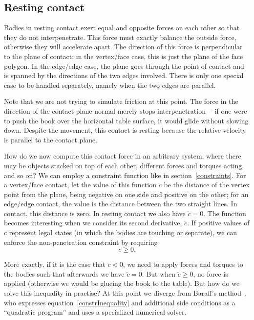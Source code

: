 \subsection{Resting contact\label{restingContact}}

Bodies in resting contact exert equal and opposite forces on each other so that they do not
interpenetrate. This force must exactly balance the outside force, otherwise they will accelerate
apart. The direction of this force is perpendicular to the plane of contact; in the vertex/face
case, this is just the plane of the face polygon. In the edge/edge case, the plane goes
through the point of contact and is spanned by the directions of the two edges involved.
There is only one special case to be handled separately, namely when the two edges are parallel.

Note that we are not trying to simulate friction at this point. The force in the direction of the
contact plane normal merely stops interpenetration~-- if one were to push the book over the
horizontal table surface, it would glide without slowing down. Despite the movement, this contact
is resting because the relative velocity is parallel to the contact plane.

How do we now compute this contact force in an arbitrary system, where there may be objects stacked
on top of each other, different forces and torques acting, and so on? We can employ a constraint
function like in section~\ref{constraints}. For a vertex/face contact, let the value of this
function $c$ be the distance of the vertex point from the plane, being negative on
one side and positive on the other; for an edge/edge contact, the value is the distance between the
two straight lines. In contact, this distance is zero. In resting contact we also have
$\dot{c} = 0$. The function becomes interesting when we consider its second
derivative, $\ddot{c}$. If positive values of $c$ represent legal states (in which the
bodies are touching or separate), we can enforce the non-penetration constraint by requiring
\begin{equation} \label{constrInequality}
\ddot{c} \ge 0.
\end{equation}

More exactly, if it is the case that $\ddot{c} < 0$, we need to apply forces and torques
to the bodies such that afterwards we have $\ddot{c} = 0$. But when
$\ddot{c} \ge 0$, no force is applied (otherwise we would be glueing the book to the
table). But how do we solve this inequality in practise? At this point we diverge from Baraff's
method~\cite{BaraffWitkin:97}, who expresses equation~\ref{constrInequality} and additional
side conditions as a ``quadratic program'' and uses a specialized numerical solver.

